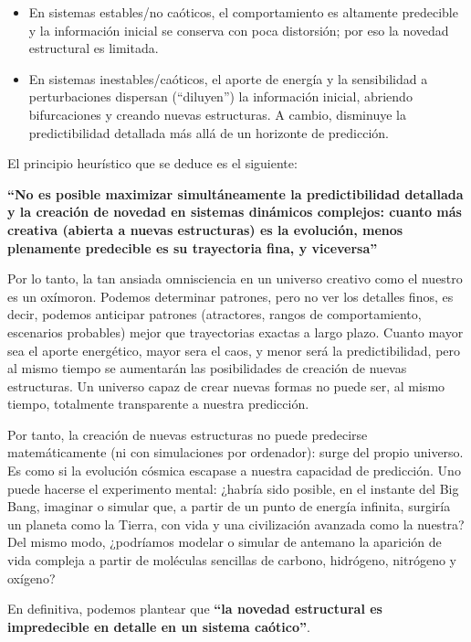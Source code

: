 \documentclass[
  10pt,
  a4paper,
  DIV=11,
  numbers=noendperiod,
  open=any]{scrreprt}
\numberwithin{equation}{chapter}
\numberwithin{equation}{section}
\renewcommand{\[}{\begin{equation}}
\renewcommand{\]}{\end{equation}}
\begin{document}
\begin{itemize}
\item
  En sistemas estables/no caóticos, el comportamiento es altamente
  predecible y la información inicial se conserva con poca distorsión;
  por eso la novedad estructural es limitada.
\item
  En sistemas inestables/caóticos, el aporte de energía y la
  sensibilidad a perturbaciones dispersan (``diluyen'') la información
  inicial, abriendo bifurcaciones y creando nuevas estructuras. A
  cambio, disminuye la predictibilidad detallada más allá de un
  horizonte de predicción.
\end{itemize}

El principio heurístico que se deduce es el siguiente:

\textbf{``No es posible maximizar simultáneamente la predictibilidad
detallada y la creación de novedad en sistemas dinámicos complejos:
cuanto más creativa (abierta a nuevas estructuras) es la evolución,
menos plenamente predecible es su trayectoria fina, y viceversa''}

Por lo tanto, la tan ansiada omnisciencia en un universo creativo como
el nuestro es un oxímoron. Podemos determinar patrones, pero no ver los
detalles finos, es decir, podemos anticipar patrones (atractores, rangos
de comportamiento, escenarios probables) mejor que trayectorias exactas
a largo plazo. Cuanto mayor sea el aporte energético, mayor sera el
caos, y menor será la predictibilidad, pero al mismo tiempo se
aumentarán las posibilidades de creación de nuevas estructuras. Un
universo capaz de crear nuevas formas no puede ser, al mismo tiempo,
totalmente transparente a nuestra predicción.

Por tanto, la creación de nuevas estructuras no puede predecirse
matemáticamente (ni con simulaciones por ordenador): surge del propio
universo. Es como si la evolución cósmica escapase a nuestra capacidad
de predicción. Uno puede hacerse el experimento mental: ¿habría sido
posible, en el instante del Big Bang, imaginar o simular que, a partir
de un punto de energía infinita, surgiría un planeta como la Tierra, con
vida y una civilización avanzada como la nuestra? Del mismo modo,
¿podríamos modelar o simular de antemano la aparición de vida compleja a
partir de moléculas sencillas de carbono, hidrógeno, nitrógeno y
oxígeno?

En definitiva, podemos plantear que \textbf{``la novedad estructural es
impredecible en detalle en un sistema caótico''}.
\end{document}
